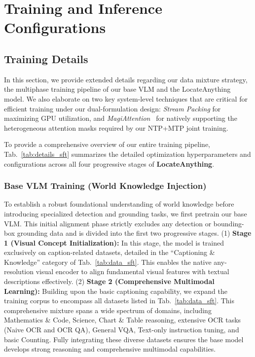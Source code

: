\section{Training and Inference Configurations}

\subsection{Training Details}

In this section, we provide extended details regarding our data mixture strategy, the multiphase training pipeline of our base VLM and the LocateAnything model. We also elaborate on two key system-level techniques that are critical for efficient training under our dual-formulation design: \textit{Stream Packing} for maximizing GPU utilization, and \textit{MagiAttention}~\citep{magiattention2025} for natively supporting the heterogeneous attention masks required by our NTP+MTP joint training.

To provide a comprehensive overview of our entire training pipeline, Tab.~\ref{tab:details_sft} summarizes the detailed optimization hyperparameters and configurations across all four progressive stages of \textbf{LocateAnything}.



\subsubsection{Base VLM Training (World Knowledge Injection)}
To establish a robust foundational understanding of world knowledge before introducing specialized detection and grounding tasks, we first pretrain our base VLM. This initial alignment phase strictly excludes any detection or bounding-box grounding data and is divided into the first two progressive stages. (1) \textbf{Stage 1 (Visual Concept Initialization):} In this stage, the model is trained exclusively on caption-related datasets, detailed in the ``Captioning \& Knowledge'' category of Tab.~\ref{tab:data_sft}. This enables the native any-resolution visual encoder to align fundamental visual features with textual descriptions effectively. (2) \textbf{Stage 2 (Comprehensive Multimodal Learning):} Building upon the basic captioning capability, we expand the training corpus to encompass all datasets listed in Tab.~\ref{tab:data_sft}. This comprehensive mixture spans a wide spectrum of domains, including Mathematics \& Code, Science, Chart \& Table reasoning, extensive OCR tasks (Naive OCR and OCR QA), General VQA, Text-only instruction tuning, and basic Counting. Fully integrating these diverse datasets ensures the base model develops strong reasoning and comprehensive multimodal capabilities.

